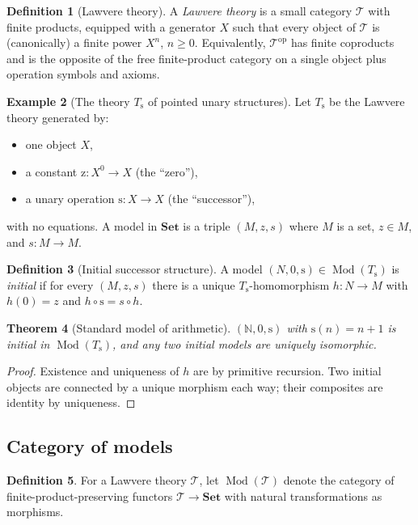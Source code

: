 \documentclass[12pt]{article}
\newtheorem{theorem}{Theorem}[section]
\theoremstyle{definition}
\newtheorem{definition}[theorem]{Definition}
\newtheorem{example}[theorem]{Example}
\theoremstyle{remark}
\newcommand{\Set}{\mathbf{Set}}
\newcommand{\op}{\mathrm{op}}
\newcommand{\NN}{\mathbb{N}}
\newcommand{\T}{\mathcal{T}}
\newcommand{\Mod}[1]{\operatorname{Mod}(#1)}
\newcommand{\succop}{\mathrm{s}}
\newcommand{\zeroop}{\mathrm{z}}
\begin{document}
\begin{definition}[Lawvere theory]
A \emph{Lawvere theory} is a small category $\T$ with finite products, equipped with a generator $X$ such that every object of $\T$ is (canonically) a finite power $X^n$, $n \geq 0$. Equivalently, $\T^\op$ has finite coproducts and is the opposite of the free finite-product category on a single object plus operation symbols and axioms.
\end{definition}

\begin{example}[The theory $T_\succop$ of pointed unary structures]\label{ex:Tsucc}
Let $T_\succop$ be the Lawvere theory generated by:
\begin{itemize}
  \item one object $X$,
  \item a constant $\zeroop : X^0 \to X$ (the ``zero''),
  \item a unary operation $\succop : X \to X$ (the ``successor''),
\end{itemize}
with no equations. A model in $\Set$ is a triple $(M, z, s)$ where $M$ is a set, $z \in M$, and $s : M \to M$.
\end{example}

\begin{definition}[Initial successor structure]
A model $(N, 0, \succop) \in \Mod{T_\succop}$ is \emph{initial} if for every $(M, z, s)$ there is a unique $T_\succop$-homomorphism $h : N \to M$ with $h(0) = z$ and $h \circ \succop = s \circ h$.
\end{definition}

\begin{theorem}[Standard model of arithmetic]\label{thm:initial-N}
$(\NN, 0, \succop)$ with $\succop(n) = n+1$ is initial in $\Mod{T_\succop}$, and any two initial models are uniquely isomorphic.
\end{theorem}

\begin{proof}
Existence and uniqueness of $h$ are by primitive recursion. Two initial objects are connected by a unique morphism each way; their composites are identity by uniqueness.
\end{proof}

\subsection{Category of models}

\begin{definition}
For a Lawvere theory $\T$, let $\Mod{\T}$ denote the category of finite-product-preserving functors $\T \to \Set$ with natural transformations as morphisms.
\end{definition}
\end{document}
